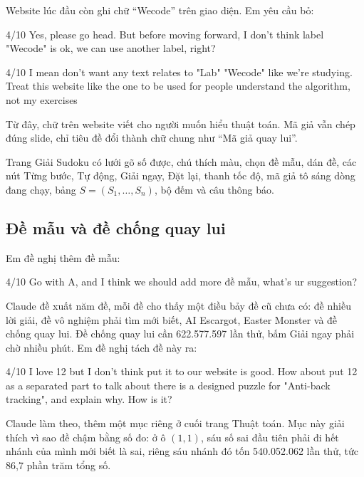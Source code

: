 Website lúc đầu còn ghi chữ ``Wecode'' trên giao diện. Em yêu cầu bỏ:

\begin{promptbox}{4/10}
Yes, please go head. But before moving forward, I don't think label "Wecode" is ok, we can use another label, right?
\end{promptbox}

\begin{promptbox}{4/10}
I mean don't want any text relates to "Lab" "Wecode" like we're studying. Treat this website like the one to be used for people understand the algorithm, not my exercises
\end{promptbox}

Từ đây, chữ trên website viết cho người muốn hiểu thuật toán. Mã giả vẫn chép đúng slide, chỉ tiêu đề đổi thành chữ chung như ``Mã giả quay lui''.

Trang Giải Sudoku có lưới gõ số được, chú thích màu, chọn đề mẫu, dán đề, các nút Từng bước, Tự động, Giải ngay, Đặt lại, thanh tốc độ, mã giả tô sáng dòng đang chạy, bảng $S = (S_1, \ldots, S_n)$, bộ đếm và câu thông báo.

\subsection*{Đề mẫu và đề chống quay lui}

Em đề nghị thêm đề mẫu:

\begin{promptbox}{4/10}
Go with A, and I think we should add more đề mẫu, what's ur suggestion?
\end{promptbox}

Claude đề xuất năm đề, mỗi đề cho thấy một điều bảy đề cũ chưa có: đề nhiều lời giải, đề vô nghiệm phải tìm mới biết, AI Escargot, Easter Monster và đề chống quay lui. Đề chống quay lui cần 622.577.597 lần thử, bấm Giải ngay phải chờ nhiều phút. Em đề nghị tách đề này ra:

\begin{promptbox}{4/10}
I love 12 but I don't think put it to our website is good. How about put 12 as a separated part to talk about there is a designed puzzle for "Anti-back tracking", and explain why. How is it?
\end{promptbox}

Claude làm theo, thêm một mục riêng ở cuối trang Thuật toán. Mục này giải thích vì sao đề chậm bằng số đo: ở ô \((1, 1)\), sáu số sai đầu tiên phải đi hết nhánh của mình mới biết là sai, riêng sáu nhánh đó tốn 540.052.062 lần thử, tức 86,7 phần trăm tổng số.

